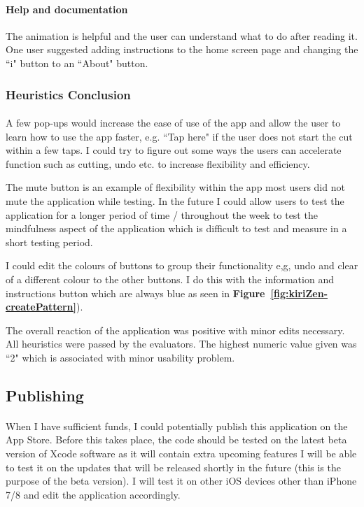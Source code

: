 \documentclass[11pt]{article}
\begin{document}
                \paragraph{Help and documentation} 
                The animation is helpful and the user can understand what to do after reading it. One user suggested adding instructions to the home screen page and changing the ``i" button to an ``About" button.
                
                \subsubsection{Heuristics Conclusion}
                \paragraph{}
                A few pop-ups would increase the ease of use of the app and allow the user to learn how to use the app faster, e.g. ``Tap here" if the user does not start the cut within a few taps. I could try to figure out some ways the users can accelerate function such as cutting, undo etc. to increase flexibility and efficiency. 
                
                The mute button is an example of flexibility within the app most users did not mute the application while testing. In the future I could allow users to test the application for a longer period of time / throughout the week to test the mindfulness aspect of the application which is difficult to test and measure in a short testing period. 
                
                 I could edit the colours of buttons to group their functionality e,g, undo and clear of a different colour to the other buttons. I do this with the information and instructions button which are always blue as seen in \textbf{Figure~\ref{fig:kiriZen-createPattern}}).
                
                The overall reaction of the application was positive with minor edits necessary. All heuristics were passed by the evaluators. The highest numeric value given was ``2" which is associated with minor usability problem.
                
        

    \subsection{Publishing}
        \paragraph{}
        When I have sufficient funds, I could potentially publish this application on the App Store. Before this takes place, the code should be tested on the latest beta version of Xcode software as it will contain extra upcoming features I will be able to test it on the updates that will be released shortly in the future (this is the purpose of the beta version). I will test it on other iOS devices other than iPhone 7/8 and edit the application accordingly.
        
\end{document}
